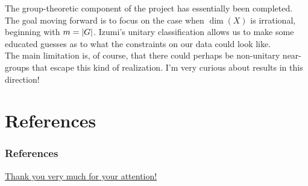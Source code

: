 \documentclass{beamer}
\DeclarePairedDelimiter{\abs}{\lvert}{\rvert}
\begin{document}
\begin{frame}
The group-theoretic component of the project has essentially been completed.\pause\\[2ex]

The goal moving forward is to focus on the case when $\dim(X)$ is irrational, beginning with $m = \abs{G}$. Izumi's unitary classification allows us to make some educated guesses as to what the constraints on our data could look like.\pause\\[2ex]

The main limitation is, of course, that there could perhaps be non-unitary near-groups that escape this kind of realization. I'm very curious about results in this direction!
\end{frame}


\section*{References}

\begin{frame}[allowframebreaks]
\frametitle{References}
\printbibliography[heading = none]
\end{frame}


\begin{frame}
\noindent\centerline{\LARGE\textcolor{structure}{\underline{Thank you very much for your attention!}}}
\end{frame}
\end{document}
